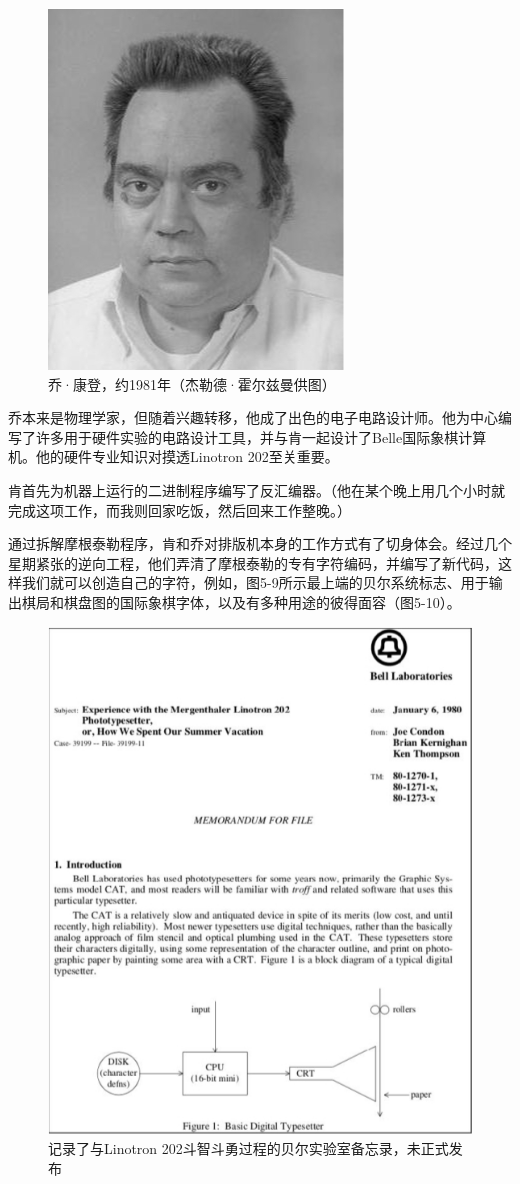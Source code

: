 \documentclass[a4paper,12pt,UTF8,twoside]{ctexbook}
\begin{document}
\begin{figure}[htbp]
	\centering
	\includegraphics[width=0.7\linewidth]{47}
	\caption{乔·康登，约1981年（杰勒德·霍尔兹曼供图）}
	\label{fig:1}
\end{figure}

乔本来是物理学家，但随着兴趣转移，他成了出色的电子电路设计师。他为中心编写了许多用于硬件实验的电路设计工具，并与肯一起设计了Belle国际象棋计算机。他的硬件专业知识对摸透Linotron 202至关重要。

肯首先为机器上运行的二进制程序编写了反汇编器。（他在某个晚上用几个小时就完成这项工作，而我则回家吃饭，然后回来工作整晚。）

通过拆解摩根泰勒程序，肯和乔对排版机本身的工作方式有了切身体会。经过几个星期紧张的逆向工程，他们弄清了摩根泰勒的专有字符编码，并编写了新代码，这样我们就可以创造自己的字符，例如，图5-9所示最上端的贝尔系统标志、用于输出棋局和棋盘图的国际象棋字体，以及有多种用途的彼得面容（图5-10）。

\begin{figure}[htbp]
	\centering
	\includegraphics[width=0.7\linewidth]{48}
	\caption{记录了与Linotron 202斗智斗勇过程的贝尔实验室备忘录，未正式发布}
	\label{fig:1}
\end{figure}
\end{document}
